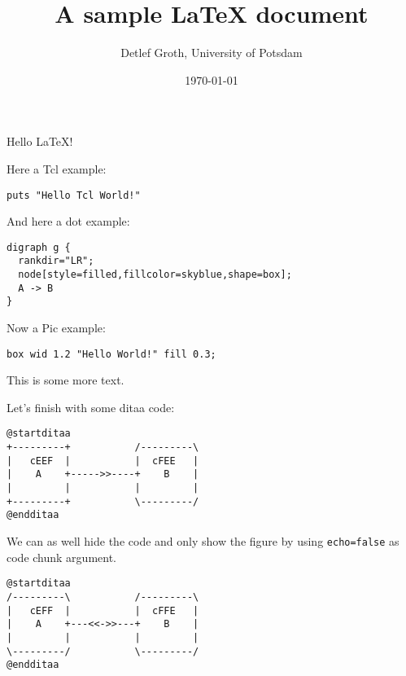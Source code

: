 \documentclass{article}
\title{A sample LaTeX document}
\author{Detlef Groth, University of Potsdam}
\date{\today}
\begin{document}
\maketitle

Hello LaTeX!

Here a Tcl example:

\begin{Verbatim}[filter=tcl,label=test,echo=true,eval=true]
puts "Hello Tcl World!"
\end{Verbatim}

And here a dot example:

\begin{Verbatim}[filter=dot,eval=true]
digraph g {
  rankdir="LR";
  node[style=filled,fillcolor=skyblue,shape=box];
  A -> B
}
\end{Verbatim}

Now a Pic example:

\begin{Verbatim}[filter=pic,eval=true]
    box wid 1.2 "Hello World!" fill 0.3;
\end{Verbatim}
    
This is some more text.

Let's finish with some ditaa code:

\begin{Verbatim}[filter=puml,eval=true]
@startditaa
+---------+           /---------\
|   cEEF  |           |  cFEE   |
|    A    +----->>----+    B    |
|         |           |         |
+---------+           \---------/
@endditaa
\end{Verbatim}

We can as well hide the code and only show the figure by using
\texttt{echo=false} as code chunk argument.

\begin{Verbatim}[filter=puml,eval=true,echo=false]
@startditaa
/---------\           /---------\
|   cEFF  |           |  cFFE   |
|    A    +---<<->>---+    B    |
|         |           |         |
\---------/           \---------/
@endditaa
\end{Verbatim}
\end{document}
